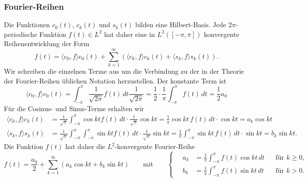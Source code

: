 %
%
\subsubsection{Fourier-Reihen}
Die Funktionen $c_0(t)$, $c_k(t)$ und $s_k(t)$ bilden eine Hilbert-Basis.
Jede $2\pi$-periodische Funktion $f(t)\in L^2$ hat daher eine in
$L^2([-\pi,\pi])$ konvergente Reihenentwicklung der Form
\[
f(t)
=
\langle c_0,f\rangle c_0(t)
+
\sum_{k=1}^\infty
(
\langle c_k,f\rangle c_k(t)
+
\langle s_k,f\rangle s_k(t)
).
\]
Wir schreiben die einzelnen Terme aus um die Verbindung zu der in der
Theorie der Fourier-Reihen üblichen Notation herzustellen.
Der konstante Term ist
\[
\langle c_0,f\rangle c_0(t)
=
\int_{-\pi}^\pi \frac{1}{\sqrt{2\pi}} f(t)\,dt \frac{1}{\sqrt{2\pi}}
=
\frac12 \cdot \frac1{\pi} \int_{-\pi}^\pi f(t)\,dt
=
\frac12 a_0
\]
Für die Cosinus- und Sinus-Terme erhalten wir 
\begin{align*}
\langle c_k,f\rangle c_k(t)
&=
\frac{1}{\sqrt{\pi}}
\int_{-\pi}^\pi \cos kt f(t)\,dt \cdot \frac{1}{\sqrt{\pi}}\cos kt
=
\frac{1}{\pi} \cos kt\,f(t)\,dt\cdot \cos kt
=
a_k \cos kt
\\
\langle s_k,f\rangle s_k(t)
&=
\frac{1}{\sqrt{\pi}}
\int_{-\pi}^\pi \int_{-\pi}^\pi \sin kt f(t)\,dt \cdot \frac{1}{\sqrt{\pi}}\sin kt
=
\frac{1}{\pi} \int_{-\pi}^\pi \sin kt\,f(t)\,dt\cdot \sin kt
=
b_k \sin kt.
\end{align*}
Die Funktion $f(t)$ hat daher die $L^2$-konvergente Fourier-Reihe
\[
f(t) = \frac{a_0}{2} + \sum_{k=1}^\infty (a_k \cos kt + b_k \sin kt)
\qquad\text{mit}\qquad
\left\{
\quad
\begin{aligned}
a_k
&=
\frac{1}{\pi}
\int_{-\pi}^\pi f(t) \cos kt\,dt
&&\text{für $k\ge 0$,}
\\
b_k
&=
\frac{1}{\pi}
\int_{-\pi}^\pi f(t) \sin kt\,dt
&&\text{für $k> 0$.}
\end{aligned}
\right.
\]

%
%

